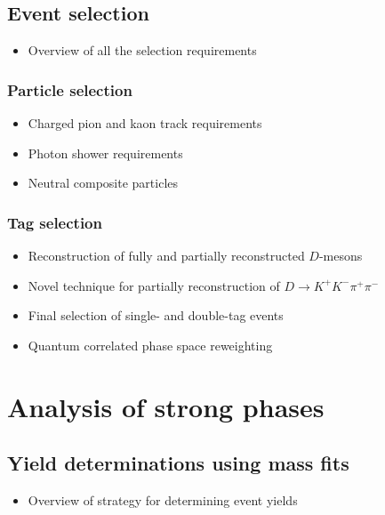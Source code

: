 \documentclass[12pt, a4paper, notitlepage, onecolumn]{article}
\begin{document}
\subsection{Event selection}
  \begin{itemize}[nosep]
    \setlength{\itemindent}{2em}
    \item[\textendash]{Overview of all the selection requirements}
  \end{itemize}
\subsubsection{Particle selection}
  \begin{itemize}[nosep]
    \setlength{\itemindent}{2.5em}
    \item[\textasteriskcentered]{Charged pion and kaon track requirements}
    \item[\textasteriskcentered]{Photon shower requirements}
    \item[\textasteriskcentered]{Neutral composite particles}
  \end{itemize}
\subsubsection{Tag selection}
  \begin{itemize}[nosep]
    \setlength{\itemindent}{2.5em}
    \item[\textasteriskcentered]{Reconstruction of fully and partially reconstructed $D$-mesons}
    \item[\textasteriskcentered]{Novel technique for partially reconstruction of $D\to K^+K^-\pi^+\pi^-$}
    \item[\textasteriskcentered]{Final selection of single- and double-tag events}
    \item[\textasteriskcentered]{Quantum correlated phase space reweighting}
  \end{itemize}

\section{Analysis of \texorpdfstring{}{D02KKpipi} strong phases}
\label{section_Analysis_of_D02KKpipi_strong_phases}
\subsection{Yield determinations using mass fits}
  \begin{itemize}[nosep]
    \setlength{\itemindent}{2em}
    \item[\textendash]{Overview of strategy for determining event yields}
  \end{itemize}
\end{document}
